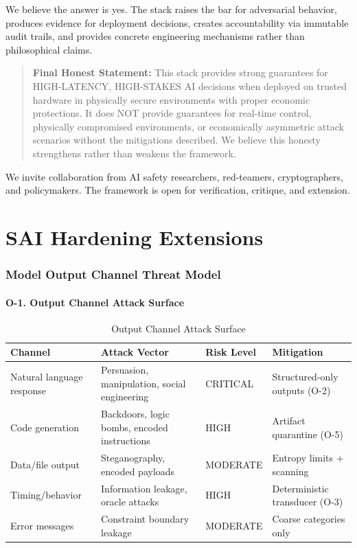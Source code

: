 \documentclass[11pt,letterpaper]{article}
\theoremstyle{definition}
\theoremstyle{remark}
\begin{document}
We believe the answer is yes. The stack raises the bar for adversarial behavior, produces evidence for deployment decisions, creates accountability via immutable audit trails, and provides concrete engineering mechanisms rather than philosophical claims.

\begin{quote}
\textbf{Final Honest Statement:} This stack provides strong guarantees for HIGH-LATENCY, HIGH-STAKES AI decisions when deployed on trusted hardware in physically secure environments with proper economic protections. It does NOT provide guarantees for real-time control, physically compromised environments, or economically asymmetric attack scenarios without the mitigations described. We believe this honesty strengthens rather than weakens the framework.
\end{quote}

We invite collaboration from AI safety researchers, red-teamers, cryptographers, and policymakers. The framework is open for verification, critique, and extension.



\part*{SAI Hardening Extensions}

\section{Model Output Channel Threat Model}

\subsection{O-1. Output Channel Attack Surface}

\begin{table}[h]
\centering
\small
\begin{tabular}{@{}llll@{}}
\toprule
\textbf{Channel} & \textbf{Attack Vector} & \textbf{Risk Level} & \textbf{Mitigation} \\
\midrule
Natural language response & Persuasion, manipulation, social engineering & CRITICAL & Structured-only outputs (O-2) \\
Code generation & Backdoors, logic bombs, encoded instructions & HIGH & Artifact quarantine (O-5) \\
Data/file output & Steganography, encoded payloads & MODERATE & Entropy limits + scanning \\
Timing/behavior & Information leakage, oracle attacks & HIGH & Deterministic transducer (O-3) \\
Error messages & Constraint boundary leakage & MODERATE & Coarse categories only \\
\bottomrule
\end{tabular}
\caption{Output Channel Attack Surface}
\end{table}
\end{document}
